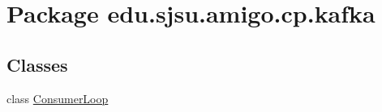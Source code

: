 \hypertarget{namespaceedu_1_1sjsu_1_1amigo_1_1cp_1_1kafka}{}\section{Package edu.\+sjsu.\+amigo.\+cp.\+kafka}
\label{namespaceedu_1_1sjsu_1_1amigo_1_1cp_1_1kafka}
\subsection*{Classes}
\begin{DoxyCompactItemize}
\item 
class \hyperlink{classedu_1_1sjsu_1_1amigo_1_1cp_1_1kafka_1_1_consumer_loop}{Consumer\+Loop}
\end{DoxyCompactItemize}
